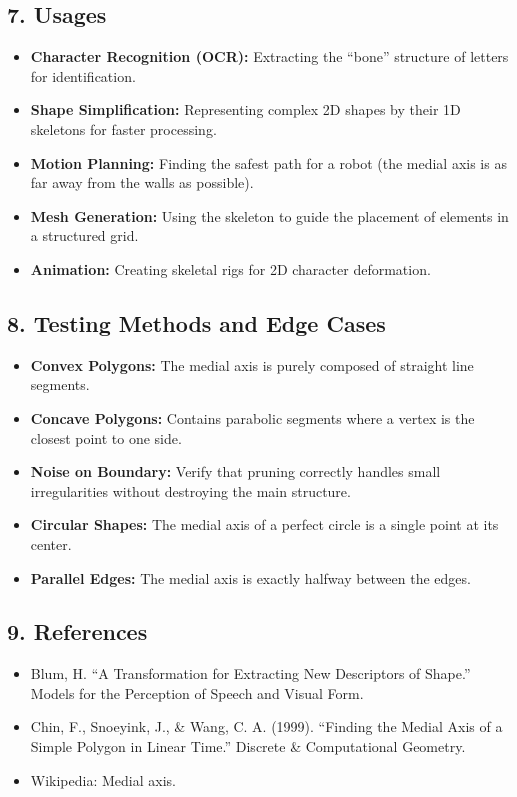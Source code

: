 \subsection{7. Usages}

\begin{itemize}
    \item \textbf{Character Recognition (OCR):} Extracting the ``bone'' structure of letters for identification.
    \item \textbf{Shape Simplification:} Representing complex 2D shapes by their 1D skeletons for faster processing.
    \item \textbf{Motion Planning:} Finding the safest path for a robot (the medial axis is as far away from the walls as possible).
    \item \textbf{Mesh Generation:} Using the skeleton to guide the placement of elements in a structured grid.
    \item \textbf{Animation:} Creating skeletal rigs for 2D character deformation.
\end{itemize}

\subsection{8. Testing Methods and Edge Cases}

\begin{itemize}
    \item \textbf{Convex Polygons:} The medial axis is purely composed of straight line segments.
    \item \textbf{Concave Polygons:} Contains parabolic segments where a vertex is the closest point to one side.
    \item \textbf{Noise on Boundary:} Verify that pruning correctly handles small irregularities without destroying the main structure.
    \item \textbf{Circular Shapes:} The medial axis of a perfect circle is a single point at its center.
    \item \textbf{Parallel Edges:} The medial axis is exactly halfway between the edges.
\end{itemize}

\subsection{9. References}

\begin{itemize}
    \item Blum, H. \cite{blum1967} ``A Transformation for Extracting New Descriptors of Shape.'' Models for the Perception of Speech and Visual Form.
    \item Chin, F., Snoeyink, J., \& Wang, C. A. (1999). ``Finding the Medial Axis of a Simple Polygon in Linear Time.'' Discrete \& Computational Geometry.
    \item Wikipedia: Medial axis.
\end{itemize}

